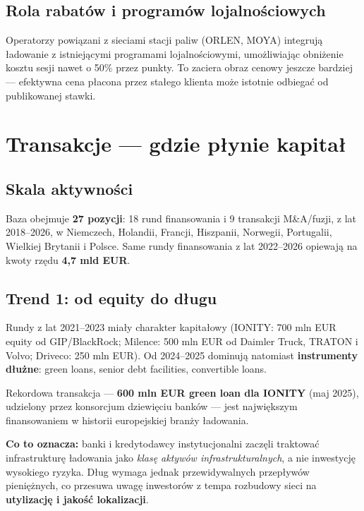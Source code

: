 \documentclass[11pt,a4paper]{article}
\begin{document}
	\subsection{Rola rabatów i programów lojalnościowych}
	
	Operatorzy powiązani z sieciami stacji paliw (ORLEN, MOYA) integrują
	ładowanie z istniejącymi programami lojalnościowymi, umożliwiając obniżenie
	kosztu sesji nawet o 50\% przez punkty. To zaciera obraz cenowy jeszcze
	bardziej --- efektywna cena płacona przez stałego klienta może istotnie
	odbiegać od publikowanej stawki.
	
	\section{Transakcje --- gdzie płynie kapitał}
	
	\subsection{Skala aktywności}
	
	Baza obejmuje \textbf{27 pozycji}: 18 rund finansowania i 9 transakcji
	M\&A/fuzji, z lat 2018--2026, w Niemczech, Holandii, Francji, Hiszpanii,
	Norwegii, Portugalii, Wielkiej Brytanii i Polsce. Same rundy finansowania
	z lat 2022--2026 opiewają na kwoty rzędu \textbf{4,7 mld EUR}.
	
	\subsection{Trend 1: od equity do długu}
	
	Rundy z lat 2021--2023 miały charakter kapitałowy (IONITY: 700 mln EUR
	equity od GIP/BlackRock; Milence: 500 mln EUR od Daimler Truck, TRATON
	i Volvo; Driveco: 250 mln EUR). Od 2024--2025 dominują natomiast
	\textbf{instrumenty dłużne}: green loans, senior debt facilities,
	convertible loans.
	
	Rekordowa transakcja --- \textbf{600 mln EUR green loan dla IONITY} (maj
	2025), udzielony przez konsorcjum dziewięciu banków --- jest największym
	finansowaniem w historii europejskiej branży ładowania.
	
	\begin{infobox}
		\textbf{Co to oznacza:} banki i kredytodawcy instytucjonalni zaczęli
		traktować infrastrukturę ładowania jako \emph{klasę aktywów
			infrastrukturalnych}, a nie inwestycję wysokiego ryzyka. Dług wymaga
		jednak przewidywalnych przepływów pieniężnych, co przesuwa uwagę
		inwestorów z tempa rozbudowy sieci na \textbf{utylizację i jakość
			lokalizacji}.
	\end{infobox}
	
\end{document}
